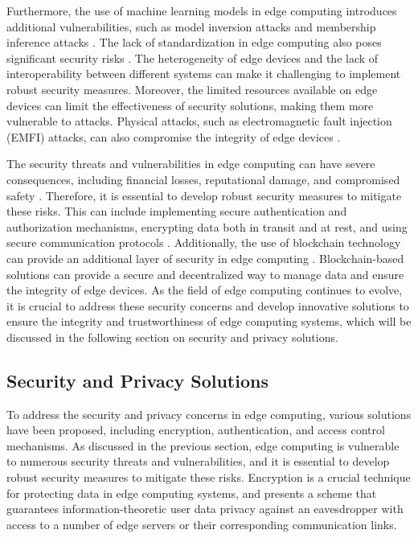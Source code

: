 \documentclass[11pt]{article}
\begin{document}
Furthermore, the use of machine learning models in edge computing introduces additional vulnerabilities, such as model inversion attacks and membership inference attacks \cite{ref17}. The lack of standardization in edge computing also poses significant security risks \cite{ref18}. The heterogeneity of edge devices and the lack of interoperability between different systems can make it challenging to implement robust security measures. Moreover, the limited resources available on edge devices can limit the effectiveness of security solutions, making them more vulnerable to attacks. Physical attacks, such as electromagnetic fault injection (EMFI) attacks, can also compromise the integrity of edge devices \cite{ref91}.

The security threats and vulnerabilities in edge computing can have severe consequences, including financial losses, reputational damage, and compromised safety \cite{ref92}. Therefore, it is essential to develop robust security measures to mitigate these risks. This can include implementing secure authentication and authorization mechanisms, encrypting data both in transit and at rest, and using secure communication protocols \cite{ref93}. Additionally, the use of blockchain technology can provide an additional layer of security in edge computing \cite{ref39}. Blockchain-based solutions can provide a secure and decentralized way to manage data and ensure the integrity of edge devices. As the field of edge computing continues to evolve, it is crucial to address these security concerns and develop innovative solutions to ensure the integrity and trustworthiness of edge computing systems, which will be discussed in the following section on security and privacy solutions.

\subsection{Security and Privacy Solutions}

To address the security and privacy concerns in edge computing, various solutions have been proposed, including encryption, authentication, and access control mechanisms. As discussed in the previous section, edge computing is vulnerable to numerous security threats and vulnerabilities, and it is essential to develop robust security measures to mitigate these risks. Encryption is a crucial technique for protecting data in edge computing systems, and \cite{ref94} presents a scheme that guarantees information-theoretic user data privacy against an eavesdropper with access to a number of edge servers or their corresponding communication links.
\end{document}
